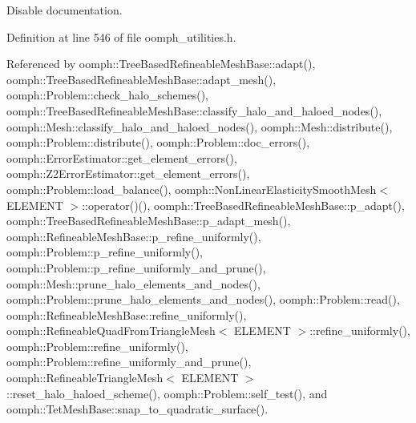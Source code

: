 Disable documentation. 



Definition at line 546 of file oomph\+\_\+utilities.\+h.



Referenced by oomph\+::\+Tree\+Based\+Refineable\+Mesh\+Base\+::adapt(), oomph\+::\+Tree\+Based\+Refineable\+Mesh\+Base\+::adapt\+\_\+mesh(), oomph\+::\+Problem\+::check\+\_\+halo\+\_\+schemes(), oomph\+::\+Tree\+Based\+Refineable\+Mesh\+Base\+::classify\+\_\+halo\+\_\+and\+\_\+haloed\+\_\+nodes(), oomph\+::\+Mesh\+::classify\+\_\+halo\+\_\+and\+\_\+haloed\+\_\+nodes(), oomph\+::\+Mesh\+::distribute(), oomph\+::\+Problem\+::distribute(), oomph\+::\+Problem\+::doc\+\_\+errors(), oomph\+::\+Error\+Estimator\+::get\+\_\+element\+\_\+errors(), oomph\+::\+Z2\+Error\+Estimator\+::get\+\_\+element\+\_\+errors(), oomph\+::\+Problem\+::load\+\_\+balance(), oomph\+::\+Non\+Linear\+Elasticity\+Smooth\+Mesh$<$ E\+L\+E\+M\+E\+N\+T $>$\+::operator()(), oomph\+::\+Tree\+Based\+Refineable\+Mesh\+Base\+::p\+\_\+adapt(), oomph\+::\+Tree\+Based\+Refineable\+Mesh\+Base\+::p\+\_\+adapt\+\_\+mesh(), oomph\+::\+Refineable\+Mesh\+Base\+::p\+\_\+refine\+\_\+uniformly(), oomph\+::\+Problem\+::p\+\_\+refine\+\_\+uniformly(), oomph\+::\+Problem\+::p\+\_\+refine\+\_\+uniformly\+\_\+and\+\_\+prune(), oomph\+::\+Mesh\+::prune\+\_\+halo\+\_\+elements\+\_\+and\+\_\+nodes(), oomph\+::\+Problem\+::prune\+\_\+halo\+\_\+elements\+\_\+and\+\_\+nodes(), oomph\+::\+Problem\+::read(), oomph\+::\+Refineable\+Mesh\+Base\+::refine\+\_\+uniformly(), oomph\+::\+Refineable\+Quad\+From\+Triangle\+Mesh$<$ E\+L\+E\+M\+E\+N\+T $>$\+::refine\+\_\+uniformly(), oomph\+::\+Problem\+::refine\+\_\+uniformly(), oomph\+::\+Problem\+::refine\+\_\+uniformly\+\_\+and\+\_\+prune(), oomph\+::\+Refineable\+Triangle\+Mesh$<$ E\+L\+E\+M\+E\+N\+T $>$\+::reset\+\_\+halo\+\_\+haloed\+\_\+scheme(), oomph\+::\+Problem\+::self\+\_\+test(), and oomph\+::\+Tet\+Mesh\+Base\+::snap\+\_\+to\+\_\+quadratic\+\_\+surface().

\mbox{\label{classoomph_1_1DocInfo_a7915567faf97d45702173ed2ee3ab471}} 
